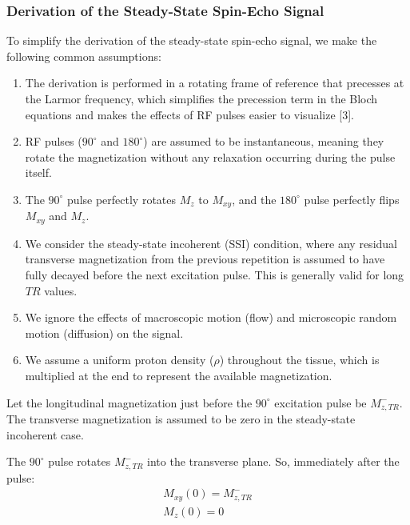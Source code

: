 \documentclass[10pt,a4paper,twoside]{article}
\begin{document}
\subsubsection{Derivation of the Steady-State Spin-Echo Signal}
To simplify the derivation of the steady-state spin-echo signal, we make the following common assumptions:
\begin{enumerate}
    \item The derivation is performed in a rotating frame of reference that precesses at the Larmor frequency, which simplifies the precession term in the Bloch equations and makes the effects of RF pulses easier to visualize [3].
    \item RF pulses ($90^\circ$ and $180^\circ$) are assumed to be instantaneous, meaning they rotate the magnetization without any relaxation occurring during the pulse itself.
    \item The $90^\circ$ pulse perfectly rotates $M_z$ to $M_{xy}$, and the $180^\circ$ pulse perfectly flips $M_{xy}$ and $M_z$.
    \item We consider the steady-state incoherent (SSI) condition, where any residual transverse magnetization from the previous repetition is assumed to have fully decayed before the next excitation pulse. This is generally valid for long $TR$ values.
    \item We ignore the effects of macroscopic motion (flow) and microscopic random motion (diffusion) on the signal.
    \item We assume a uniform proton density ($\rho$) throughout the tissue, which is multiplied at the end to represent the available magnetization.
\end{enumerate}

\vspace{12pt}

Let the longitudinal magnetization just before the $90^\circ$ excitation pulse be $M_{z,TR}^-$. The transverse magnetization is assumed to be zero in the steady-state incoherent case.

\vspace{12pt}

The $90^\circ$ pulse rotates $M_{z,TR}^-$ into the transverse plane. So, immediately after the pulse:
\begin{gather*}
M_{xy}(0) = M_{z,TR}^- \\
M_z(0) = 0
\end{gather*}

\vspace{12pt}
\end{document}
